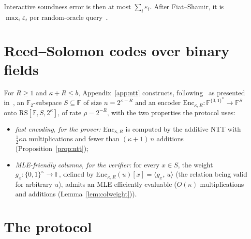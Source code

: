 \documentclass[11pt]{article}
\newcommand{\F}{\mathbb{F}}
\newcommand{\Ftwo}{\mathbb{F}_2}
\newcommand{\Enc}{\mathrm{Enc}}
\newcommand{\RS}{\mathrm{RS}}
\newcommand{\cube}[1]{\{0,1\}^{#1}}
\newcommand{\inner}[2]{\langle #1,\, #2 \rangle}
\theoremstyle{plain}
\theoremstyle{definition}
\theoremstyle{remark}
\begin{document}
Interactive soundness error is then at most $\sum_i \varepsilon_i$. After Fiat--Shamir, it is $\max_i \varepsilon_i$ per random-oracle query~\cite{CCHLRR19,BCS16}.

\section{Reed--Solomon codes over binary fields}\label{sec:binary-rs}

For $R \ge 1$ and $\kappa + R \le b$, Appendix~\ref{app:ntt} constructs, following~\cite{LCH14} as presented in~\cite{DP26}, an $\Ftwo$-subspace $S \subseteq \F$ of size $n = 2^{\kappa+R}$ and an encoder $\Enc_{\kappa,R} : \F^{\cube{\kappa}} \to \F^{S}$ onto $\RS[\F, S, 2^{\kappa}]$, of rate $\rho = 2^{-R}$, with the two properties the protocol uses:
\begin{itemize}[itemsep=2pt]
\item \emph{fast encoding, for the prover:} $\Enc_{\kappa,R}$ is computed by the additive NTT with $\tfrac12 \kappa n$ multiplications and fewer than $(\kappa + 1)\, n$ additions (Proposition~\ref{prop:ntt});
\item \emph{MLE-friendly columns, for the verifier:} for every $x \in S$, the weight $g_x : \cube{\kappa} \to \F$, defined by $\Enc_{\kappa,R}(u)[x] = \inner{g_x}{u}$ (the relation being valid for arbitrary $u$), admits an MLE efficiently evaluable ($O(\kappa)$ multiplications and additions (Lemma~\ref{lem:colweight})).
\end{itemize}

\section{The protocol}\label{sec:protocol}
\end{document}
